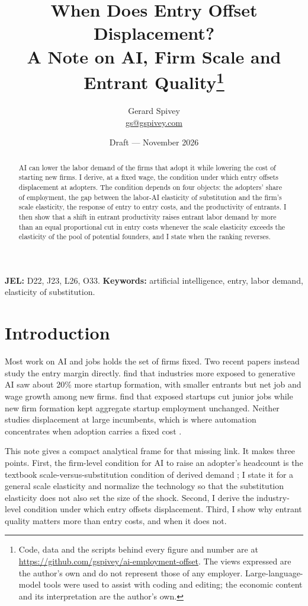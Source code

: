 \documentclass[11pt]{article}
\title{When Does Entry Offset Displacement?\\A Note on AI, Firm Scale and Entrant Quality\thanks{Code, data and the scripts behind every figure and number are at \url{https://github.com/gspivey/ai-employment-offset}. The views expressed are the author's own and do not represent those of any employer. Large-language-model tools were used to assist with coding and editing; the economic content and its interpretation are the author's own.}}
\author{Gerard Spivey\\\href{mailto:gs@gspivey.com}{gs@gspivey.com}}
\date{Draft --- November 2026}
\theoremstyle{remark}
\begin{document}
\maketitle

\begin{abstract}
\noindent
AI can lower the labor demand of the firms that adopt it while lowering the cost of starting new firms. I derive, at a fixed wage, the condition under which entry offsets displacement at adopters. The condition depends on four objects: the adopters' share of employment, the gap between the labor-AI elasticity of substitution and the firm's scale elasticity, the response of entry to entry costs, and the productivity of entrants. I then show that a shift in entrant productivity raises entrant labor demand by more than an equal proportional cut in entry costs whenever the scale elasticity exceeds the elasticity of the pool of potential founders, and I state when the ranking reverses.
\end{abstract}

\medskip
\noindent\textbf{JEL:} D22, J23, L26, O33. \quad \textbf{Keywords:} artificial intelligence, entry, labor demand, elasticity of substitution.

\section{Introduction}

Most work on AI and jobs holds the set of firms fixed. Two recent papers instead study the entry margin directly. \citet{bena2026prompted} find that industries more exposed to generative AI saw about 20\% more startup formation, with smaller entrants but net job and wage growth among new firms. \citet{gupta2026generative} find that exposed startups cut junior jobs while new firm formation kept aggregate startup employment unchanged. Neither studies displacement at large incumbents, which is where automation concentrates when adoption carries a fixed cost \citep{hubmer2021typical}.

This note gives a compact analytical frame for that missing link. It makes three points. First, the firm-level condition for AI to raise an adopter's headcount is the textbook scale-versus-substitution condition of derived demand \citep{hamermesh1993labor}; I state it for a general scale elasticity and normalize the technology so that the substitution elasticity does not also set the size of the shock. Second, I derive the industry-level condition under which entry offsets displacement. Third, I show why entrant quality matters more than entry costs, and when it does not.
\end{document}
